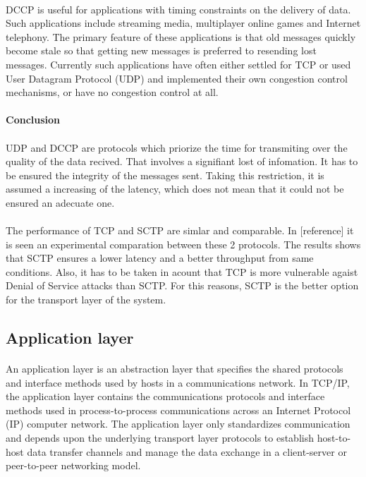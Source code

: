 \paragraph{}
DCCP is useful for applications with timing constraints on the delivery of data. Such applications include streaming media, multiplayer online games and Internet telephony. The primary feature of these applications is that old messages quickly become stale so that getting new messages is preferred to resending lost messages. Currently such applications have often either settled for TCP or used User Datagram Protocol (UDP) and implemented their own congestion control mechanisms, or have no congestion control at all.

\paragraph{} \textbf{Conclusion}
\paragraph{}
UDP and DCCP are protocols which priorize the time for transmiting over the quality of the data recived. That involves a signifiant lost of infomation. It has to be ensured the integrity of the messages sent. Taking this restriction, it is assumed a increasing of the latency, which does not mean that it could not be ensured an adecuate one.
\paragraph{}
The performance of TCP and SCTP are simlar and comparable. In [reference] it is seen an experimental comparation between these 2 protocols. The results shows that SCTP ensures a lower latency and a better throughput from same conditions. Also, it has to be taken in acount that TCP is more vulnerable agaist Denial of Service attacks than SCTP. For this reasons, SCTP is the better option for the transport layer of the system.

\subsection{Application layer}
\paragraph{}
An application layer is an abstraction layer that specifies the shared protocols and interface methods used by hosts in a communications network. In TCP/IP, the application layer contains the communications protocols and interface methods used in process-to-process communications across an Internet Protocol (IP) computer network. The application layer only standardizes communication and depends upon the underlying transport layer protocols to establish host-to-host data transfer channels and manage the data exchange in a client-server or peer-to-peer networking model. 
